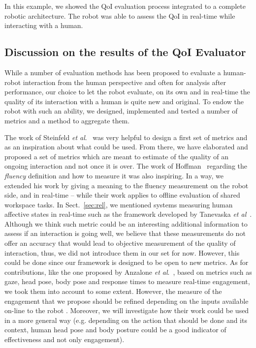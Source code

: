 \documentclass[a4paper,11pt,twoside]{StyleThese}
\begin{document}
In this example, we showed the QoI evaluation process integrated to a complete robotic architecture. The robot was able to assess the QoI in real-time while interacting with a human.

\subsection{Discussion on the results of the QoI Evaluator}
While a number of evaluation methods has been proposed to evaluate a human-robot interaction from the human perspective and often for analysis after performance, our choice to let the robot evaluate, on its own and in real-time the quality of its interaction with a human is quite new and original. To endow the robot with such an ability, we designed, implemented and tested a number of metrics and a method to aggregate them.

The work of Steinfeld \textit{et al}.~\cite{steinfeld_2006_common} was very helpful to design a first set of metrics and as an inspiration about what could be used. From there, we have elaborated and proposed a set of metrics which are meant to estimate of the quality of an ongoing interaction and not once it is over. 
The work of Hoffman~\cite{hoffman2019} regarding the \textit{fluency} definition and how to measure it was also inspiring. In a way, we extended his work by giving a meaning to the fluency measurement on the robot side, and in real-time -- while their work applies to offline evaluation of shared workspace tasks. 
In Sect.~\ref{sec:rel}, we mentioned systems measuring human affective states in real-time such as the framework developed by Tanevaska \textit{et al}~\cite{tanevska:hal-01615491}. Although we think such metric could be an interesting additional information to assess if an interaction is going well, we believe that these measurements do not offer an accuracy that would lead to objective measurement of the quality of interaction, thus, we did not introduce them in our set for now. However, this could be done since our framework is designed to be open to new metrics. 
As for contributions, like the one proposed by Anzalone \textit{et al}.~\cite{anzalone_2015_evaluating}, based on metrics such as gaze, head pose, body pose and response times to measure real-time engagement, we took them into account to some extent. However, the measure of the engagement that we propose should be refined depending on the inputs available on-line to the robot . Moreover, we will investigate how their work could be used in a more general way (e.g. depending on the action that should be done and its context, human head pose and body posture could be a good indicator of effectiveness and not only engagement). 
\end{document}
